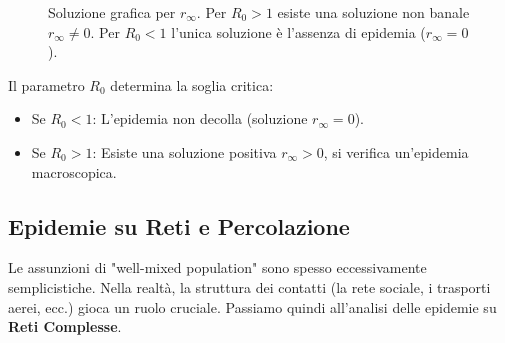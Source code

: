 \begin{figure}[h]
\centering
{}
\caption{Soluzione grafica per $r_\infty$. Per $R_0 > 1$  esiste una soluzione non banale $r_\infty \neq 0$. Per $R_0 < 1$ l'unica soluzione è l'assenza di epidemia ($r_\infty = 0$).}
\end{figure}

Il parametro $R_0$ determina la soglia critica:
\begin{itemize}
    \item Se $R_0 < 1$: L'epidemia non decolla (soluzione $r_\infty = 0$).
    \item Se $R_0 > 1$: Esiste una soluzione positiva $r_\infty > 0$, si verifica un'epidemia macroscopica.
\end{itemize}

\newpage
\subsection{Epidemie su Reti e Percolazione}

Le assunzioni di "well-mixed population" sono spesso eccessivamente semplicistiche. Nella realtà, la struttura dei contatti (la rete sociale, i trasporti aerei, ecc.) gioca un ruolo cruciale.
Passiamo quindi all'analisi delle epidemie su \textbf{Reti Complesse}.

